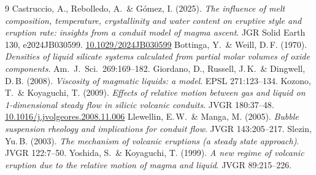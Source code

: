 \documentclass[11pt,a4paper]{article}
\begin{document}
\begin{thebibliography}{9}\small
{} Castruccio, A., Rebolledo, A.\ \& Gómez, I.
  (2025). \emph{The influence of melt composition, temperature,
  crystallinity and water content on eruptive style and eruption rate:
  insights from a conduit model of magma ascent}. JGR Solid Earth 130,
  e2024JB030599.
  \href{https://doi.org/10.1029/2024JB030599}{10.1029/2024JB030599}
 Bottinga, Y.\ \& Weill, D.\,F. (1970).
  \emph{Densities of liquid silicate systems calculated from partial
  molar volumes of oxide components}. Am.\ J.\ Sci.\ 269:169--182.
 Giordano, D., Russell, J.\,K.\ \& Dingwell,
  D.\,B. (2008). \emph{Viscosity of magmatic liquids: a model}.
  EPSL 271:123--134.
 Kozono, T.\ \& Koyaguchi, T. (2009).
  \emph{Effects of relative motion between gas and liquid on
  1-dimensional steady flow in silicic volcanic conduits}.
  JVGR 180:37--48.
  \href{https://doi.org/10.1016/j.jvolgeores.2008.11.006}{10.1016/j.jvolgeores.2008.11.006}
 Llewellin, E.\,W.\ \& Manga, M. (2005).
  \emph{Bubble suspension rheology and implications for conduit flow}.
  JVGR 143:205--217.
 Slezin, Yu.\,B. (2003).
  \emph{The mechanism of volcanic eruptions (a steady state approach)}.
  JVGR 122:7--50.
 Yoshida, S.\ \& Koyaguchi, T. (1999).
  \emph{A new regime of volcanic eruption due to the relative motion
  of magma and liquid}. JVGR 89:215--226.
\end{thebibliography}
\end{document}
